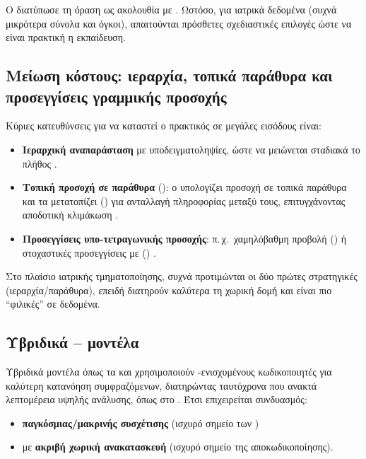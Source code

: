 Ο  \cite{dosovitskiy2021vit} διατύπωσε τη  όραση ως ακολουθία  με . Ωστόσο, για ιατρικά δεδομένα (συχνά μικρότερα σύνολα και  όγκοι), απαιτούνται πρόσθετες σχεδιαστικές επιλογές ώστε να είναι πρακτική η εκπαίδευση.

\subsection{Μείωση κόστους: ιεραρχία, τοπικά παράθυρα και προσεγγίσεις γραμμικής προσοχής}
Κύριες κατευθύνσεις για να καταστεί ο  πρακτικός σε μεγάλες
εισόδους είναι:
\begin{itemize}
  \item \textbf{Ιεραρχική αναπαράσταση} με υποδειγματοληψίες, ώστε να
        μειώνεται σταδιακά το πλήθος .
  \item \textbf{Τοπική προσοχή σε παράθυρα} ():
        ο  υπολογίζει προσοχή σε τοπικά παράθυρα και
        τα μετατοπίζει () για ανταλλαγή πληροφορίας
        μεταξύ τους, επιτυγχάνοντας αποδοτική κλιμάκωση \cite{liu2021swin}.
  \item \textbf{Προσεγγίσεις υπο-τετραγωνικής προσοχής}: π.\,χ.\ χαμηλόβαθμη
        προβολή () \cite{wang2020linformer} ή στοχαστικές
        προσεγγίσεις με  ()
        \cite{choromanski2021performer}.
\end{itemize}
Στο πλαίσιο ιατρικής τμηματοποίησης, συχνά προτιμώνται οι δύο πρώτες
στρατηγικές (ιεραρχία/παράθυρα), επειδή διατηρούν καλύτερα τη χωρική δομή
και είναι πιο ``φιλικές'' σε  δεδομένα.

\subsection{Υβριδικά -- μοντέλα}
Υβριδικά μοντέλα όπως τα  \cite{hatamizadeh2022unetr} και  \cite{hatamizadeh2022swinunetr}
χρησιμοποιούν -ενισχυμένους κωδικοποιητές για καλύτερη κατανόηση συμφραζόμενων, διατηρώντας ταυτό\-χρονα
 που ανακτά λεπτομέρεια υψηλής ανάλυσης, όπως στο . Έτσι επιχειρεί\-ται συνδυασμός:
\begin{itemize}
  \item \textbf{παγκόσμιας/μακρινής συσχέτισης} (ισχυρό σημείο των )
  \item με \textbf{ακριβή χωρική ανακατασκευή} (ισχυρό σημείο της  αποκωδικοποίησης).
\end{itemize}

